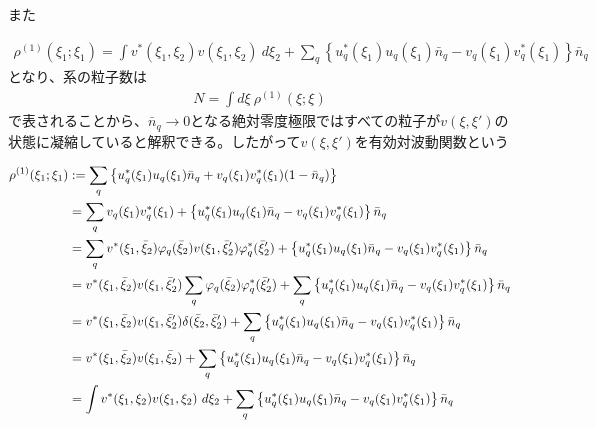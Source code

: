 \documentclass[dvipdfmx, 11pt, a4paper]{jsarticle}
\numberwithin{equation}{section}
\theoremstyle{definition}
\begin{document}
    また
    \begin{note}
    \begin{align}
            \rho^{(1)}(\xi_1;\xi_1) = \int v^*(\xi_1,\xi_2)v(\xi_1,\xi_2)\ d\xi_2+ \sum_q\left\{ u_q^*(\xi_1)u_q(\xi_1)\bar{n}_q-v_q(\xi_1)v_q^*(\xi_1) \right\} \bar{n}_q \label{Iciuvmitudo}
    \end{align}
    となり、系の粒子数は
    \begin{align}
        N = \int d\xi\ \rho^{(1)}(\xi;\xi)
    \end{align}
    で表されることから、$\bar{n}_q\rightarrow0$となる絶対零度極限ではすべての粒子が$v(\xi,\xi')$の状態に凝縮していると解釈できる。したがって$v(\xi,\xi')$を有効対波動関数という
    \end{note}
    \begin{derivationBox}
        \begin{align}
            \rho^{(1)}(\xi_1;\xi_1) &:=  \sum_q\left\{ u_q^*(\xi_1)u_q(\xi_1)\bar{n}_q+v_q(\xi_1)v_q^*(\xi_1)(1-\bar{n}_q) \right\} \notag \\
            &=\sum_qv_q(\xi_1)v_q^*(\xi_1) + \left\{ u_q^*(\xi_1)u_q(\xi_1)\bar{n}_q-v_q(\xi_1)v_q^*(\xi_1) \right\} \bar{n}_q \notag \\
            &=\sum_qv^*(\xi_1,\bar{\xi}_2)\varphi_q(\bar{\xi}_2)v(\xi_1,\bar{\xi}_2')\varphi_q^*(\bar{\xi}_2') + \left\{ u_q^*(\xi_1)u_q(\xi_1)\bar{n}_q-v_q(\xi_1)v_q^*(\xi_1) \right\} \bar{n}_q \notag \\
            &=v^*(\xi_1,\bar{\xi}_2)v(\xi_1,\bar{\xi}_2')\sum_q\varphi_q(\bar{\xi}_2)\varphi_q^*(\bar{\xi}_2') + \sum_q\left\{ u_q^*(\xi_1)u_q(\xi_1)\bar{n}_q-v_q(\xi_1)v_q^*(\xi_1) \right\} \bar{n}_q \notag \\
            &=v^*(\xi_1,\bar{\xi}_2)v(\xi_1,\bar{\xi}_2')\delta(\bar{\xi}_2,\bar{\xi}_2') + \sum_q\left\{ u_q^*(\xi_1)u_q(\xi_1)\bar{n}_q-v_q(\xi_1)v_q^*(\xi_1) \right\} \bar{n}_q \notag \\
            &=v^*(\xi_1,\bar{\xi}_2)v(\xi_1,\bar{\xi}_2) + \sum_q\left\{ u_q^*(\xi_1)u_q(\xi_1)\bar{n}_q-v_q(\xi_1)v_q^*(\xi_1) \right\} \bar{n}_q \notag \\
            &=\int v^*(\xi_1,\xi_2)v(\xi_1,\xi_2)\ d\xi_2+ \sum_q\left\{ u_q^*(\xi_1)u_q(\xi_1)\bar{n}_q-v_q(\xi_1)v_q^*(\xi_1) \right\} \bar{n}_q
        \end{align}
    \end{derivationBox}
\end{document}
